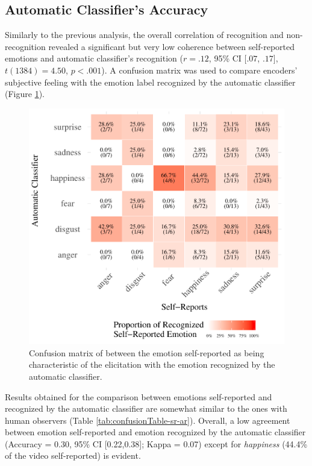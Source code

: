 \documentclass[man]{apa6}
\begin{document}
\hypertarget{automatic-classifiers-accuracy}{%
\subsection{Automatic Classifier's Accuracy}\label{automatic-classifiers-accuracy}}

Similarly to the previous analysis, the overall correlation of recognition and non-recognition revealed a significant but very low coherence between self-reported emotions and automatic classifier's recognition (\(r = .12\), 95\% CI \([.07\), \(.17]\), \(t(1384) = 4.50\), \(p < .001\)). A confusion matrix was used to compare encoders' subjective feeling with the emotion label recognized by the automatic classifier (Figure \ref{fig:confusionMatrix-sr-ar}).

\begin{figure}[!h]
\includegraphics[width=\textwidth]{manuscript_apa_files/figure-latex/confusionMatrix-sr-ar-1} \caption{Confusion matrix of between the emotion self-reported as being characteristic of the elicitation with the emotion recognized by the automatic classifier.}\label{fig:confusionMatrix-sr-ar}
\end{figure}

Results obtained for the comparison between emotions self-reported and recognized by the automatic classifier are somewhat similar to the ones with human observers (Table \ref{tab:confusionTable-sr-ar}). Overall, a low agreement between emotion self-reported and emotion recognized by the automatic classifier (Accuracy = 0.30, 95\% CI {[}0.22,0.38{]}; Kappa = 0.07) except for \emph{happiness} (44.4\% of the video self-reported) is evident.
\end{document}
